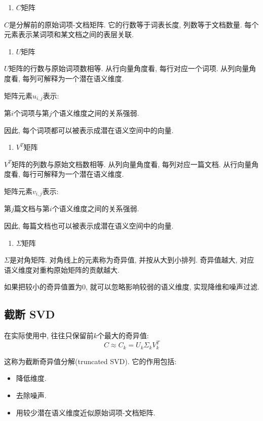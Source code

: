 \begin{enumerate}
\item[1.] $C$矩阵
\end{enumerate}

$C$是分解前的原始词项-文档矩阵.
它的行数等于词表长度, 列数等于文档数量.
每个元素表示某词项和某文档之间的表层关联.

\begin{enumerate}
\item[2.] $U$矩阵
\end{enumerate}

$U$矩阵的行数与原始词项数相等.
从行向量角度看, 每行对应一个词项.
从列向量角度看, 每列可解释为一个潜在语义维度.

矩阵元素$u_{i,j}$表示:

第$i$个词项与第$j$个语义维度之间的关系强弱.

因此, 每个词项都可以被表示成潜在语义空间中的向量.

\begin{enumerate}
\item[3.] $V^T$矩阵
\end{enumerate}

$V^T$矩阵的列数与原始文档数相等.
从列向量角度看, 每列对应一篇文档.
从行向量角度看, 每行可解释为一个潜在语义维度.

矩阵元素$v_{i,j}$表示:

第$j$篇文档与第$i$个语义维度之间的关系强弱.

因此, 每篇文档也可以被表示成潜在语义空间中的向量.

\begin{enumerate}
\item[4.] $\Sigma$矩阵
\end{enumerate}

$\Sigma$是对角矩阵.
对角线上的元素称为奇异值, 并按从大到小排列.
奇异值越大, 对应语义维度对重构原始矩阵的贡献越大.

如果把较小的奇异值置为$0$,
就可以忽略影响较弱的语义维度, 实现降维和噪声过滤.

\subsection{截断 SVD}


在实际使用中, 往往只保留前$k$个最大的奇异值:
\[
C \approx C_k = U_k \Sigma_k V_k^T
\]

这称为截断奇异值分解(truncated SVD).
它的作用包括:

\begin{itemize}
\item 降低维度.
\item 去除噪声.
\item 用较少潜在语义维度近似原始词项-文档矩阵.
\end{itemize}

